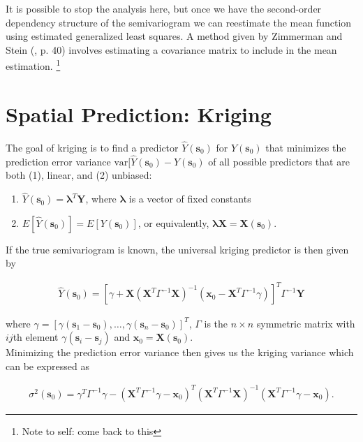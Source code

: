 \documentclass[12pt]{amsart}
\begin{document}
It is possible to stop the analysis here, but once we have the second-order dependency structure of the semivariogram we can reestimate the mean function using estimated generalized least squares. A method given by Zimmerman and Stein (\cite{gelfand:2010}, p. 40) involves estimating a covariance matrix to include in the mean estimation. \footnote{Note to self: come back to this}

\section{Spatial Prediction: Kriging}
The goal of kriging is to find a predictor $\hat Y(\mathbf{s}_0)$ for $Y(\mathbf{s}_0)$ that minimizes the prediction error variance $\text{var}[\hat Y(\mathbf{s}_0) - Y(\mathbf{s}_0)$ of all possible predictors that are both (1), linear, and  (2) unbiased:

\begin{enumerate}
\item $\hat Y(\mathbf{s}_0) = \mathbf{\lambda}^T\mathbf{Y}$, where $\mathbf{\lambda}$ is a vector of fixed constants
\item $E[\hat Y(\mathbf{s}_0)] = E[Y(\mathbf{s}_0)]$, or equivalently, $\mathbf{\lambda}\mathbf{X} = \mathbf{X}(\mathbf{s}_0)$.
\end{enumerate}

If the true semivariogram is known, the universal kriging predictor is then given by

\begin{align*}
\hat Y(\mathbf{s}_0) = [\gamma + \mathbf{X}(\mathbf{X}^T\Gamma^{-1}\mathbf{X})^{-1}(\mathbf{x}_0 - \mathbf{X}^T\Gamma^{-1}\gamma)]^T\Gamma^{-1}\mathbf{Y}
\end{align*}

where $\gamma = [\gamma(\mathbf{s}_1 - \mathbf{s}_0), \dots, \gamma(\mathbf{s}_n - \mathbf{s}_0)]^T$, $\Gamma$ is the $n \times n$ symmetric matrix with $ij$th element $\gamma(\mathbf{s}_i - \mathbf{s}_j)$ and $\mathbf{x}_0 = \mathbf{X}(\mathbf{s}_0)$. \\

Minimizing the prediction error variance then gives us the kriging variance which can be expressed as

\begin{align*}
\sigma^2(\mathbf{s}_0) = \gamma^T\Gamma^{-1}\gamma - (\mathbf{X}^T\Gamma^{-1}\gamma - \mathbf{x}_0)^T(\mathbf{X}^T\Gamma^{-1}\mathbf{X})^{-1}(\mathbf{X}^T\Gamma^{-1}\gamma - \mathbf{x}_0).
\end{align*}

\newpage

\nocite{*}




\end{document}
